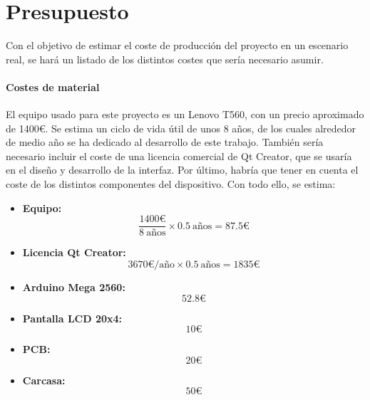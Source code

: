 \chapter{Presupuesto}

Con el objetivo de estimar el coste de producción del proyecto en un escenario real, se hará un listado de los distintos costes que sería necesario asumir.

\subsubsection{Costes de material}

El equipo usado para este proyecto es un Lenovo T560, con un precio aproximado de 1400€. Se estima un ciclo de vida útil de unos 8 años, de los cuales alrededor de medio año se ha dedicado al desarrollo de este trabajo. También sería necesario incluir el coste de una licencia comercial de Qt Creator, que se usaría en el diseño y desarrollo de la interfaz. Por último, habría que tener en cuenta el coste de los distintos componentes del dispositivo. Con todo ello, se estima:

\begin{itemize}
    \item\textbf{Equipo:} \[\frac{1400\text{€}}{8\ \text{años}} \times 0.5\ \text{años} = 87.5\text{€} \]
\end{itemize}

\begin{itemize}
    \item\textbf{Licencia Qt Creator:} \[ 3670\text{€/año} \times 0.5\ \text{años} = 1835\text{€} \]
\end{itemize}

\begin{itemize}
    \item\textbf{Arduino Mega 2560:} \[ 52.8\text{€} \]
\end{itemize}

\begin{itemize}
    \item\textbf{Pantalla LCD 20x4:} \[ 10\text{€} \]
\end{itemize}

\begin{itemize}
    \item\textbf{PCB:} \[ 20\text{€} \]
\end{itemize}

\begin{itemize}
    \item\textbf{Carcasa:} \[ 50\text{€} \]
\end{itemize}

